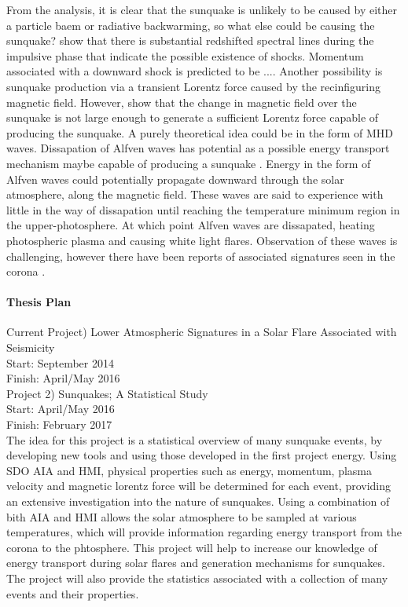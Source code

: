 From the analysis, it is clear that the sunquake is unlikely to be caused by either a particle baem or radiative backwarming, so what else could be causing the sunquake? \cite{2015ApJ...812...35M} show that there is substantial redshifted spectral lines during the impulsive phase that indicate the possible existence of shocks. Momentum associated with a downward shock is predicted to be .... Another possibility is sunquake production via a transient Lorentz force caused by the recinfiguring magnetic field. However, \cite{2014ApJ...796...85J} show that the change in magnetic field over the sunquake is not large enough to generate a sufficient Lorentz force capable of producing the sunquake. A purely theoretical idea could be in the form of MHD waves. Dissapation of Alfven waves \citep{1982SoPh...80...99E} has potential as a possible energy transport mechanism maybe capable of producing a sunquake \citep{2015ApJ...812...35M}. Energy in the form of Alfven waves could potentially propagate downward through the solar atmosphere, along the magnetic field. These waves are said to experience with little in the way of dissapation until reaching the temperature minimum region in the upper-photosphere. At which point Alfven waves are dissapated, heating photospheric plasma and causing white light flares. Observation of these waves is challenging, however there have been reports of associated signatures seen in the corona \citep{2009A&A...501L..15B}. 

\paragraph{Thesis Plan}
Current Project) Lower Atmospheric Signatures in a Solar Flare Associated with Seismicity\\
Start: September 2014\\
Finish: April/May 2016\\

Project 2) Sunquakes; A Statistical Study\\
Start: April/May 2016\\
Finish: February 2017\\

The idea for this project is a statistical overview of many sunquake events, by developing new tools and using those developed in the first project energy. Using SDO AIA and HMI, physical properties such as energy, momentum, plasma velocity and magnetic lorentz force will be determined for each event, providing an extensive investigation into the nature of sunquakes. Using a combination of bith AIA and HMI allows the solar atmosphere to be sampled at various temperatures, which will provide information regarding energy transport from the corona to the phtosphere. This project will help to increase our knowledge of energy transport during solar flares and generation mechanisms for sunquakes. The project will also provide the statistics associated with a collection of many events and their properties. 

